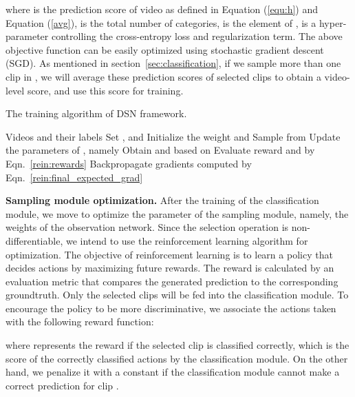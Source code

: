 \documentclass[journal]{IEEEtran}
\begin{document}
where  is the prediction score of video  as defined in Equation (\ref{equ:h}) and Equation (\ref{avg}),  is the total number of categories,  is the  element of ,  is a hyper-parameter controlling the cross-entropy loss and  regularization term.
The above objective function can be easily optimized using stochastic gradient descent (SGD).
As mentioned in section~\ref{sec:classification}, if we sample more than one clip in , we will average these prediction scores of selected clips to obtain a video-level score, and use this score for training.

\renewcommand{\algorithmicrequire}{\textbf{Input:}}
\begin{algorithm}[t]
        \caption{The training algorithm of DSN framework.}
        \begin{algorithmic}[1]
        \Require Videos and their labels 
            \State Set ,  and 
            \State Initialize the weight  and 
                \State Sample  from 
                    \State 
                    \State 
                    \State Update the parameters of , namely 
                \EndIf
                    \State 
                    \State Obtain  and  based on 
                    \State Evaluate reward  and  by Eqn.~\ref{rein:rewards}
                    \State Backpropagate gradients computed by Eqn.~\ref{rein:final_expected_grad}
                \EndFor
            \EndFor
        \end{algorithmic}
\label{alg:procedure}
\end{algorithm}

{\bf Sampling module optimization.} After the training of the classification module, we move to optimize the parameter of the sampling module, namely, the weights of the observation network.
Since the selection operation is non-differentiable, we intend to use the reinforcement learning algorithm for optimization.
The objective of reinforcement learning is to learn a policy  that decides actions by maximizing future rewards.
The reward is calculated by an evaluation metric that compares the generated prediction to the corresponding groundtruth.
Only the selected clips will be fed into the classification module.
To encourage the policy to be more discriminative, we associate the actions taken with the following reward function:

where  represents the reward if the selected clip  is classified correctly, which is the score of the correctly classified actions by the classification module.
On the other hand, we penalize it with a constant  if the classification module cannot make a correct prediction for clip .
\end{document}
